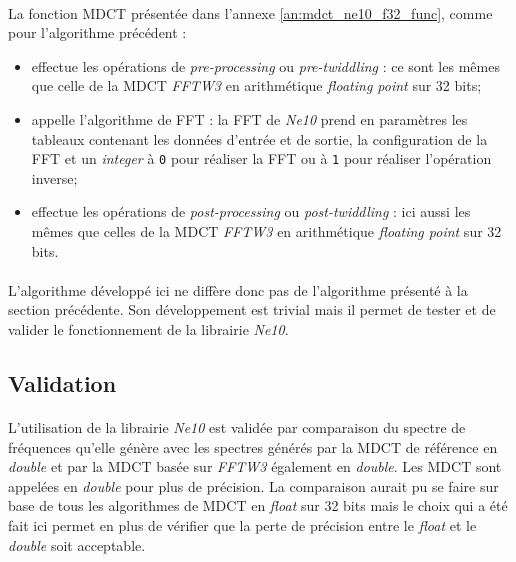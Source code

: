 \documentclass{article}
\begin{document}
    \paragraph{}
    La fonction MDCT présentée dans l'annexe \ref{an:mdct_ne10_f32_func}, comme pour l'algorithme précédent :
    \begin{itemize}
        \item effectue les opérations de \emph{pre-processing} ou \emph{pre-twiddling} : ce sont les mêmes que celle de la MDCT \emph{FFTW3} en arithmétique \emph{floating point} sur 32 bits;
        \item appelle l'algorithme de FFT : la FFT de \emph{Ne10} prend en paramètres les tableaux contenant les données d'entrée et de sortie, la configuration de la FFT et un \emph{integer} à \texttt{0} pour réaliser la FFT ou à \texttt{1} pour réaliser l'opération inverse;
        \item effectue les opérations de \emph{post-processing} ou \emph{post-twiddling} : ici aussi les mêmes que celles de la MDCT \emph{FFTW3} en arithmétique \emph{floating point} sur 32 bits.
    \end{itemize}

    \paragraph{}
    L'algorithme développé ici ne diffère donc pas de l'algorithme présenté à la section précédente. Son développement est trivial mais il permet de tester et de valider le fonctionnement de la librairie \emph{Ne10}.

    \subsection{Validation}
    \paragraph{}
    L'utilisation de la librairie \emph{Ne10} est validée par comparaison du spectre de fréquences qu'elle génère avec les spectres générés par la MDCT de référence en \emph{double} et par la MDCT basée sur \emph{FFTW3} également en \emph{double}. Les MDCT sont appelées en \emph{double} pour plus de précision. La comparaison aurait pu se faire sur base de tous les algorithmes de MDCT en \emph{float} sur 32 bits mais le choix qui a été fait ici permet en plus de vérifier que la perte de précision entre le \emph{float} et le \emph{double} soit acceptable.
\end{document}
